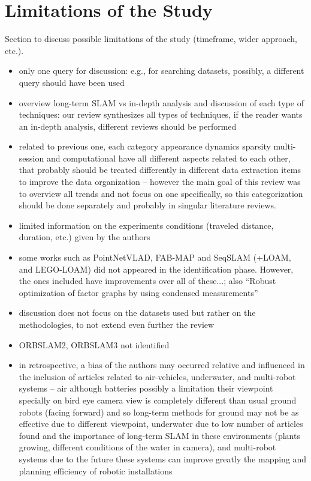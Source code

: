 \section{Limitations of the Study}
\label{sec:limitations}

Section to discuss possible limitations of the study (timeframe, wider approach, etc.).

\begin{itemize}[nosep]
\item only one query for discussion: e.g., for searching datasets, possibly, a different query should have been used
\item overview long-term SLAM vs in-depth analysis and discussion of each type of techniques: our review synthesizes all types of techniques, if the reader wants an in-depth analysis, different reviews should be performed
\item related to previous one, each category appearance dynamics sparsity multi-session and computational have all different aspects related to each other, that probably should be treated differently in different data extraction items to improve the data organization -- however the main goal of this review was to overview all trends and not focus on one specifically, so this categorization should be done separately and probably in singular literature reviews.
\item limited information on the experiments conditions (traveled distance, duration, etc.) given by the authors
\item some works such as PointNetVLAD, FAB-MAP and SeqSLAM (+LOAM, and LEGO-LOAM) did not appeared in the identification phase. However, the ones included have improvements over all of these...; also ``Robust optimization of factor graphs by using condensed measurements''
\item discussion does not focus on the datasets used but rather on the methodologies, to not extend even further the review
\item ORBSLAM2, ORBSLAM3 not identified
\item in retrospective, a bias of the authors may occurred relative and influenced in the inclusion of articles related to air-vehicles, underwater, and multi-robot systems -- air although batteries possibly a limitation their viewpoint specially on bird eye camera view is completely different than usual ground robots (facing forward) and so long-term methods for ground may not be as effective due to different viewpoint, underwater due to low number of articles found and the importance of long-term SLAM in these environments (plants growing, different conditions of the water in camera), and multi-robot systems due to the future these systems can improve greatly the mapping and planning efficiency of robotic installations
\end{itemize}
